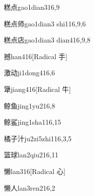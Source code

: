 \begin{verbete}{糕点}{gao1dian3}{16,9}
\end{verbete}

\begin{verbete}{糕点师}{gao1dian3 shi1}{16,9,6}
\end{verbete}

\begin{verbete}{糕点店}{gao1dian3 dian4}{16,9,8}
\end{verbete}

\begin{verbete}{撼}{han4}{16}[Radical 手]
\end{verbete}

\begin{verbete}{激动}{ji1dong4}{16,6}
\end{verbete}

\begin{verbete}{犟}{jiang4}{16}[Radical 牛]
\end{verbete}

\begin{verbete}{鲸鱼}{jing1yu2}{16,8}
\end{verbete}

\begin{verbete}{鲸鲨}{jing1sha1}{16,15}
\end{verbete}

\begin{verbete}{橘子汁}{ju2zi5zhi1}{16,3,5}
\end{verbete}

\begin{verbete}{篮球}{lan2qiu2}{16,11}
\end{verbete}

\begin{verbete}{懒}{lan3}{16}[Radical 心]
\end{verbete}

\begin{verbete}{懒人}{lan3ren2}{16,2}
\end{verbete}

